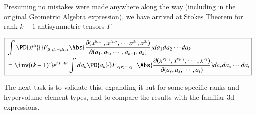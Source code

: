 Presuming no mistakes were made anywhere along the way (including in the original Geometric Algebra expression), we have arrived at Stokes Theorem for rank $k-1$ antisymmetric tensors $F$

\begin{equation}\label{eqn:antisymmetricTensorTx:650}
\boxed{
\begin{aligned}
&\int
\PD{x^{\mu_k}}{} F_{\mu_1 \mu_2 \cdots \mu_{k-1}}
\Abs{\frac{\partial(
x^{\mu_{k-1}},
x^{\mu_{k-2}},
\cdots
x^{\mu_{1}},
x^{\mu_{k}}
)}{\partial(a_1, a_2, \cdots, a_{k-1}, a_k)}
}
da_1 da_2 \cdots da_k \\
&=
\inv{(k-1)!} \epsilon^{ r s \cdots t u } \int da_u \PD{a_{u}}{} F_{\nu_1 \nu_2 \cdots \nu_{k-1} }
\Abs{\frac{\partial(
x^{\nu_{k-1}},x^{\nu_{k-2}},\cdots,x^{\nu_1}
)}{\partial(a_r, a_s, \cdots, a_t)}}
da_r da_s \cdots da_t 
\end{aligned}
}
\end{equation}

The next task is to validate this, expanding it out for some specific ranks and hypervolume element types, and to compare the results with the familiar 3d expressions.

\EndArticle
